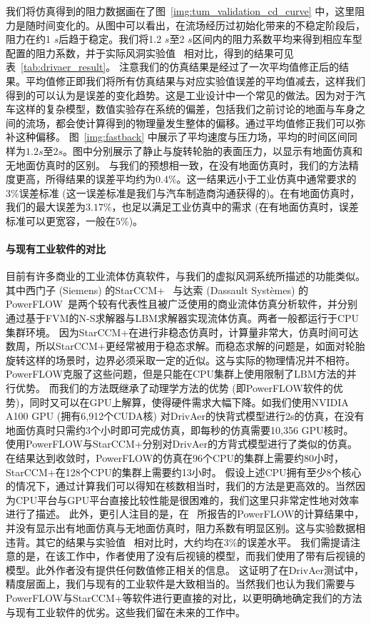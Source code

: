 我们将仿真得到的阻力数据画在了图~\ref{img:tum_validation_cd_curve} 中，这里阻力是随时间变化的。从图中可以看出，在流场经历过初始化带来的不稳定阶段后，阻力在约1 $s$后趋于稳定。我们将1.2 $s$至2 $s$区间内的阻力系数平均来得到相应车型配置的阻力系数，并于实际风洞实验值~\citep{Heft-2012b} 相对比，得到的结果可见表~\ref{tab:drivaer_result}。
注意我们的仿真结果是经过了一次平均值修正后的结果。平均值修正即我们将所有仿真结果与对应实验值误差的平均值减去，这样我们得到的可以认为是误差的变化趋势。这是工业设计中一个常见的做法。因为对于汽车这样的复杂模型，数值实验存在系统的偏差，包括我们之前讨论的地面与车身之间的流场，都会使计算得到的物理量发生整体的偏移。通过平均值修正我们可以弥补这种偏移。
图~\ref{img:fastback} 中展示了平均速度与压力场，平均的时间区间同样为$1.2s$至$2s$。图中分别展示了静止与旋转轮胎的表面压力，以显示有地面仿真和无地面仿真时的区别。
与我们的预想相一致，在没有地面仿真时，我们的方法精度更高，所得结果的误差平均约为$0.4\%$。这一结果远小于工业仿真中通常要求的$3\%$误差标准 (这一误差标准是我们与汽车制造商沟通获得的)。在有地面仿真时，我们的最大误差为$3.17\%$，也足以满足工业仿真中的需求 (在有地面仿真时，误差标准可以更宽容，一般在$5\%$)。

\paragraph{与现有工业软件的对比}
目前有许多商业的工业流体仿真软件，与我们的虚拟风洞系统所描述的功能类似。其中西门子 (Siemens) 的StarCCM+~\citep{Siemens} 与达索 (Dassault Syst{\`e}mes) 的PowerFLOW~\citep{powerflow}是两个较有代表性且被广泛使用的商业流体仿真分析软件，并分别通过基于FVM的N-S求解器与LBM求解器实现流体仿真。两者一般都运行于CPU集群环境。
因为StarCCM+在进行非稳态仿真时，计算量非常大，仿真时间可达数周，所以StarCCM+更经常被用于稳态求解。而稳态求解的问题是，如面对轮胎旋转这样的场景时，边界必须采取一定的近似。这与实际的物理情况并不相符。PowerFLOW克服了这些问题，但是只能在CPU集群上使用限制了LBM方法的并行优势。
而我们的方法既继承了动理学方法的优势 (即PowerFLOW软件的优势)，同时又可以在GPU上解算，使得硬件需求大幅下降。如我们使用NVIDIA A100 GPU (拥有6,912个CUDA核) 对DrivAer的快背式模型进行2s的仿真，在没有地面仿真时只需约3个小时即可完成仿真，即每秒的仿真需要10,356 GPU核时。
\citet{James-2018} 使用PowerFLOW与StarCCM+分别对DrivAer的方背式模型进行了类似的仿真。在结果达到收敛时，PowerFLOW的仿真在96个CPU的集群上需要约80小时，StarCCM+在128个CPU的集群上需要约13小时。
假设上述CPU拥有至少8个核心的情况下，通过计算我们可以得知在核数相当时，我们的方法是更高效的。当然因为CPU平台与GPU平台直接比较性能是很困难的，我们这里只非常定性地对效率进行了描述。
此外，更引人注目的是，在~\citet{James-2018} 所报告的PowerFLOW的计算结果中，并没有显示出有地面仿真与无地面仿真时，阻力系数有明显区别。这与实验数据相违背。其它的结果与实验值~\citep{Heft-2012b} 相对比时，大约均在3\%的误差水平。
我们需提请注意的是，在该工作中，作者使用了没有后视镜的模型，而我们使用了带有后视镜的模型。此外作者没有提供任何数值修正相关的信息。
这证明了在DrivAer测试中，精度层面上，我们与现有的工业软件是大致相当的。当然我们也认为我们需要与PowerFLOW与StarCCM+等软件进行更直接的对比，以更明确地确定我们的方法与现有工业软件的优劣。这些我们留在未来的工作中。

